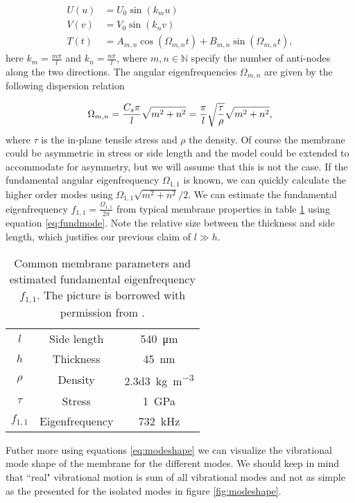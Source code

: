 \begin{subequations}
\begin{align}
U(u) & = U_0\sin(k_m u)\\
V(v) & = V_0\sin(k_n v)\\
T(t) & = A_{m,n}\cos(\Omega_{m,n} t) + B_{m,n}\sin(\Omega_{m,n} t),
\end{align}
\label{eq:modeshape}
\end{subequations}
\noindent
here $k_{m} = \frac{m\pi}{l}$ and $k_{n} = \frac{n\pi}{l}$, where $m,n \in \mathbb{N}$ specify the number of anti-nodes along the two directions. The angular eigenfrequencies $\Omega_{m,n}$ are given by the following dispersion relation \cite{wilson2009}

\begin{equation}
\Omega_{m,n} = \frac{C_s \pi}{l}\sqrt{m^2 + n^2} = \frac{\pi}{l}\sqrt{\frac{\tau}{\rho}}\sqrt{m^2 + n^2}\\
\label{eq:fundmode},
\end{equation}
\noindent
where $\tau$ is the in-plane tensile stress and $\rho$ the density. Of course the membrane could be asymmetric in stress or side length and the model could be extended to accommodate for asymmetry, but we will assume that this is not the case. If the fundamental angular eigenfrequency $\Omega_{1,1}$ is known, we can quickly calculate the higher order modes using $\Omega_{1,1}\sqrt{m^2 + n^2}/2$. We can estimate the fundamental eigenfrequency $f_{1,1} = \frac{\Omega_{1,1}}{2\pi}$ from typical membrane properties in table \ref{tab:memprop} using equation \eqref{eq:fundmode}. Note the relative size between the thickness and side length, which justifies our previous claim of $l \gg h$.

\begin{table}[H]
\centering
\begin{tabular}{ccc}
\toprule
$l$ & Side length  & \SI{540}{\micro\meter} \\
$h$ & Thickness & \SI{45}{\nano\meter} \\
$\rho$ & Density & \SI{2.3d3}{\kilogram\per\cubic\meter} \\
$\tau$ & Stress & \SI{1}{\giga\pascal} \\
\midrule
$f_{1, 1}$ & Eigenfrequency & \SI{732}{\kilo\hertz} \\
\bottomrule
\end{tabular}
\caption{Common membrane parameters and estimated fundamental eigenfrequency $f_{1,1}$. The picture is borrowed with permission from \cite{barg2014}.}
\label{tab:memprop}
\end{table}
\noindent
Futher more using equations \eqref{eq:modeshape} we can visualize the vibrational mode shape of the membrane for the different modes. We should keep in mind that ``real" vibrational motion is sum of all vibrational modes and not as simple as the presented for the isolated modes in figure \ref{fig:modeshape}.

